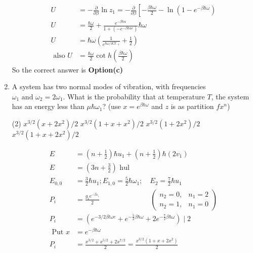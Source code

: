 \begin{enumerate}
\begin{answer}
\begin{align*}
	U&=-\frac{\partial}{\partial \beta} \ln z_{1}=-\frac{\partial}{\partial \beta}\left[-\frac{\beta \hbar \omega}{2}-\ln \left(1-e^{-\beta \hbar \omega}\right)\right.\\
	U&=\frac{\hbar \omega}{2}+\frac{e^{-\beta \hbar u}}{1+\left(-e^{-\beta \hbar u e}\right)} \hbar \omega\\
	U&=\hbar \omega\left(\frac{1}{e^{\hbar\omega/KT_{-1}}}+\frac{1}{2}\right)\\
	\text { also } U&=\frac{\hbar \omega}{2} \cot h\left(\frac{\beta \hbar \omega}{2}\right)
	\end{align*}
	So the correct answer is \textbf{Option(c)}
\end{answer}	
\item A system has two normal modes of vibration, with frequencies $\omega_{1}\text{ and }\omega_{2}=2\omega_{1}$. What is the probability that at temperature $T$, the system has an energy less than $\mu\hbar\omega_{1}$? (use $x=e^{\beta \hbar \omega}$ and $z$ is as partition $fx^n$)
	\begin{tasks}(2)
		\task[\textbf{a.}]$x^{3 / 2}\left(x+2 x^{2}\right) / 2$
		\task[\textbf{b.}]$x^{3 / 2}\left(1+x+x^{2}\right) / 2$
		\task[\textbf{c.}] $x^{3 / 2}\left(1+2 x^{2}\right) / 2$
		\task[\textbf{d.}] $x^{3 / 2}\left(1+x+2 x^{2}\right) / 2$
	\end{tasks}
\begin{answer}
	\begin{align*}
	E&=\left(n+\frac{1}{2}\right) \hbar u_{1}+\left(n+\frac{1}{2}\right) \hbar\left(2 v_{1}\right)\\
	E&=\left(3 n+\frac{3}{2}\right) \text { hul }\\
	E_{0,0}&=\frac{3}{2} \hbar u_{1} ; E_{1,0}=\frac{5}{2} \hbar \omega_{1}; \quad E_{2}=\frac{7}{2} \hbar u_{1}\\
	P_{i}&=\frac{g_{i} e^{-\beta \varepsilon_{i}}}{2}\hspace{3cm}\left(\begin{array}{ll}
	n_{2}=0, & n_{1}=2 \\
	n_{2}=1, & n_{1}=0
	\end{array}\right)\\
	P_{i}&=\left(e^{-3 / 2 \beta t \omega e}+e^{-\frac{5}{2} \beta \hbar \omega}+2 e^{-\frac{7}{2} \beta \hbar \omega}\right) \mid 2\\
	\text { Put } x&=e^{-\beta \hbar \omega}\\
	P_{i}&=\frac{x^{3 / 2}+x^{5 / 2}+2 x^{7 / 2}}{2}=\frac{x^{3 / 2}\left(1+x+2 x^{2}\right)}{2}
	\end{align*}

\end{answer}
\end{enumerate}
